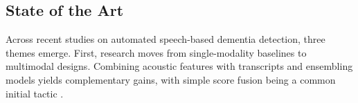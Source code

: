 \documentclass{article}
\begin{document}
{\subsection{State of the Art}





Across recent studies on automated speech-based dementia detection, three themes emerge. First, research moves from single-modality baselines to multimodal designs. Combining acoustic features with transcripts and ensembling models yields complementary gains, with simple score fusion being a common initial tactic \cite{campbell2021,syed2021,martinc2021}.

}
\end{document}
